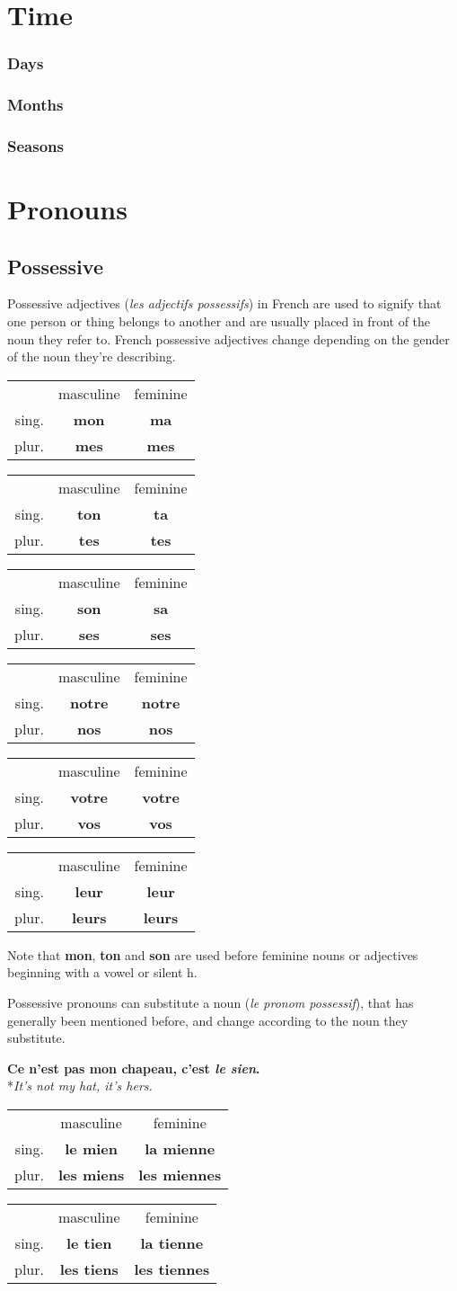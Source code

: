 \documentclass[a4paper,11pt,oneside]{book}
\newcommand{\phrase}[2]{\noindent\textbf{#1}\\*\-\hspace{0.5cm}\textit{#2}\\}
\newcommand{\noundecl}[4]{
\begin{tabular}{rcc}
 & masculine & feminine \\
 sing. & \textbf{#1} & \textbf{#2} \\
 plur. & \textbf{#3} & \textbf{#4}
\end{tabular}
}
\begin{document}
\section{Time}

\subsubsection{Days}

\subsubsection{Months}

\subsubsection{Seasons}

\section{Pronouns}

\subsection{Possessive}
Possessive adjectives (\textit{les adjectifs possessifs}) in French are used to signify that one person or thing belongs to another and are usually placed in front of the noun they refer to. 
French possessive adjectives change depending on the gender of the noun they're describing.

\begin{center}
\noundecl{mon}{ma}{mes}{mes}
\noundecl{ton}{ta}{tes}{tes}

\noundecl{son}{sa}{ses}{ses}
\noundecl{notre}{notre}{nos}{nos}

\noundecl{votre}{votre}{vos}{vos}
\noundecl{leur}{leur}{leurs}{leurs}
\end{center}

Note that \textbf{mon}, \textbf{ton} and \textbf{son} are used before feminine nouns or adjectives beginning with a vowel or silent h.

Possessive pronouns can substitute a noun (\textit{le pronom possessif}), that has generally been mentioned before, and change according to the noun they substitute.

\phrase{Ce n’est pas mon chapeau, c’est \emph{le sien}.}{It's not my hat, it's hers.}


\noundecl{le mien}{la mienne}{les miens}{les miennes}
\noundecl{le tien}{la tienne}{les tiens}{les tiennes}
\end{document}
